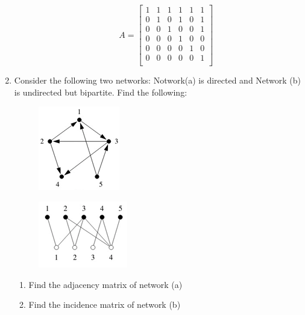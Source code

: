 \documentclass{amsart}
\theoremstyle{definition}
\theoremstyle{remark}
\numberwithin{equation}{section}
\begin{document}
\begin{enumerate}
\begin{enumerate}
    \begin{equation*}
        {A}  = \left\lbrack\begin{array}{cccccc}
        1 & 1 & 1 & 1 & 1 & 1 \\
        0 & 1 & 0 & 1 & 0 & 1 \\
        0 & 0 & 1 & 0 & 0 & 1 \\
        0 & 0 & 0 & 1 & 0 & 0 \\
        0 & 0 & 0 & 0 & 1 & 0 \\
        0 & 0 & 0 & 0 & 0 & 1 \\
        \end{array}\right\rbrack
    \end{equation*}
\end{enumerate}

\clearpage

\item Consider the following two networks: Notwork(a) is directed and Network (b) is undirected but bipartite. Find the following:
\begin{figure}[h]
\includegraphics[width=0.2\linewidth]{images/networka.PNG}
\end{figure}

\begin{figure}[h]
\includegraphics[width=0.2\linewidth]{images/networkb.PNG}
\end{figure}
\begin{enumerate}
\item Find the adjacency matrix of network (a)
\item Find the incidence matrix of network (b)
\end{enumerate}


\end{enumerate}
\end{document}
